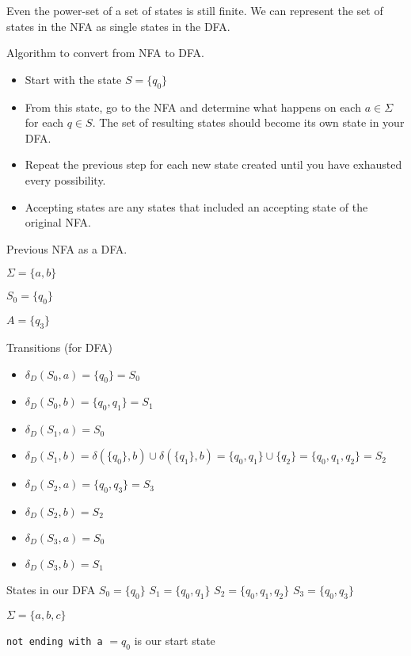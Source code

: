 \documentclass{article}
\begin{document}
Even the power-set of a set of states is still finite. We can represent
the set of states in the NFA as single states in the DFA.

Algorithm to convert from NFA to DFA.

\begin{itemize}

\item
  Start with the state \(S = \{q_0\}\)
\item
  From this state, go to the NFA and determine what happens on each
  \(a \in \Sigma\) for each \(q \in S\). The set of resulting states
  should become its own state in your DFA.
\item
  Repeat the previous step for each new state created until you have
  exhausted every possibility.
\item
  Accepting states are any states that included an accepting state of
  the original NFA.
\end{itemize}

Previous NFA as a DFA.

\(\Sigma = \{a,b\}\)

\(S_0 = \{q_0\}\)

\(A = \{q_3\}\)

Transitions (for DFA) 
\begin{itemize}
    \item \(\delta_D(S_0, a) = \{q_0\} = S_0\)
    \item \(\delta_D(S_0, b) = \{q_0, q_1\} = S_1\)
    \item \(\delta_D(S_1, a) = S_0\)
    \item \(\delta_D(S_1, b) = \delta(\{q_0\}, b) \cup \delta(\{q_1\}, b) = \{q_0, q_1\} \cup \{q_2\} = \{q_0, q_1, q_2\} = S_2\)
    \item \(\delta_D(S_2, a) = \{q_0, q_3\} = S_3\)
    \item \(\delta_D(S_2, b) = S_2\)
    \item \(\delta_D(S_3, a) = S_0\)
    \item \(\delta_D(S_3, b) = S_1\)
\end{itemize}


States in our DFA \(S_0 = \{q_0\}\) \(S_1 = \{q_0, q_1\}\)
\(S_2 = \{q_0, q_1, q_2\}\) \(S_3 = \{q_0, q_3\}\)


\(\Sigma = \{a,b,c\}\)

\texttt{not\ ending\ with\ a} \(= q_0\) is our start state
\end{document}
